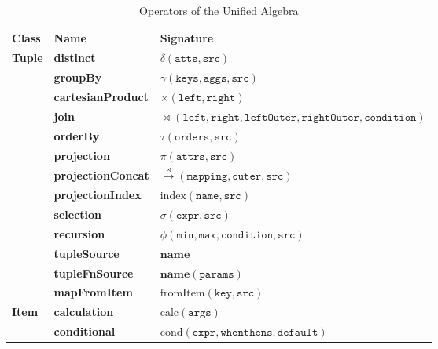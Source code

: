 \begin{table}[htp!]
\caption{Operators of the Unified Algebra}
\scriptsize
\begin{tabular}{
lll
    }
\toprule
\textbf{Class} & \textbf{Name} & \textbf{Signature} \\
\midrule
\multirow{13}{*}{\textbf{Tuple}}
& \textbf{distinct}           & $\delta(\texttt{atts}, \texttt{src})$ \\
& \textbf{groupBy}            & $\gamma(\texttt{keys},\texttt{aggs},\texttt{src})$ \\
& \textbf{cartesianProduct}   & $\times(\texttt{left},\texttt{right})$ \\
& \textbf{join}               & $\bowtie(\texttt{left},\texttt{right},\texttt{leftOuter},\texttt{rightOuter},\texttt{condition})$ \\
& \textbf{orderBy}            & $\tau(\texttt{orders},\texttt{src})$ \\
& \textbf{projection}         & $\pi(\texttt{attrs},\texttt{src})$ \\
& \textbf{projectionConcat}   & $\stackrel{\bowtie}{\rightarrow}(\texttt{mapping}, \texttt{outer}, \texttt{src})$ \\
& \textbf{projectionIndex}    & $\text{index}(\texttt{name}, \texttt{src})$ \\
& \textbf{selection}          & $\sigma(\texttt{expr}, \texttt{src})$ \\
& \textbf{recursion}          & $\phi(\texttt{min}, \texttt{max}, \texttt{condition}, \texttt{src})$  \\
& \textbf{tupleSource}        & $\textbf{name}$ \\
& \textbf{tupleFnSource}      & $\textbf{name}(\texttt{params})$ \\
& \textbf{mapFromItem}        & $\text{fromItem}(\texttt{key}, \texttt{src})$  \\
\midrule
\multirow{8}{*}{\textbf{Item}}
& \textbf{calculation}        
& $\text{calc}(\texttt{args})$ \\
& \textbf{conditional}        & $\text{cond}(\texttt{expr}, \texttt{whenthens}, \texttt{default})$ \\

\end{tabular}
\end{table}
